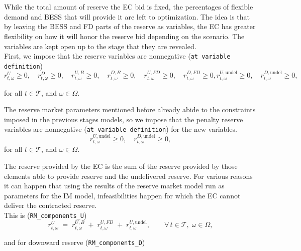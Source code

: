 \documentclass{article}
\begin{document}
\\
\\
While the total amount of reserve the EC bid is fixed, the percentages of flexible demand and BESS that will provide it are left to optimization. The idea is that by leaving the BESS and FD parts of the reserve as variables, the EC has greater flexibility on how it will honor the reserve bid depending on the scenario. The variables are kept open up to the stage that they are revealed.\\
First, we impose that the reserve variables are nonnegative (\verb|at variable definition|)
\begin{equation} \label{EQ:RVarDef}
    r^{U}_{t, \omega} \geq 0, \quad r^{D}_{t, \omega} \geq 0, \quad r^{U, B}_{t, \omega} \geq 0, \quad r^{D, B}_{t, \omega} \geq 0, \quad r^{U, FD}_{t, \omega} \geq 0, \quad r^{D, FD}_{t, \omega} \geq 0, r^{U,\text{undel}}_{t,\omega} \geq 0, \quad r^{D,\text{undel}}_{t,\omega} \geq 0, 
\end{equation}

for all $t \in \mathcal{T}$, and $\omega \in \Omega$. 


The reserve market parameters mentioned before already  abide to the constraints imposed in the previous stages models, so we impose that the penalty reserve variables are nonnegative (\verb|at variable definition|) for the new variables.\\
\begin{equation} \label{EQ:RVarDef}
    r^{U,\text{undel}}_{t,\omega} \geq 0, \quad r^{D,\text{undel}}_{t,\omega} \geq 0, 
\end{equation}
for all $t \in \mathcal{T}$, and $\omega \in \Omega$. 

The reserve provided by the EC is the sum of the reserve provided by those elements able to provide reserve and the undelivered reserve. For various reasons it can happen that using the results of the reserve market model run as parameters for the IM model, infeasibilities happen for which the EC cannot deliver the contracted reserve.  \\
This is (\verb|RM_components_U|)\\
\begin{equation} \label{EQ:RUcom}
    r^{U}_{t,\omega} \;=\;
        r^{U,B}_{t,\omega}
      \;+\; r^{U,FD}_{t,\omega}
      \;+\; r^{U,\text{undel}}_{t,\omega},
    \qquad \forall\, t\in\mathcal T,\;\omega\in\Omega ,
\end{equation}

and for downward reserve (\verb|RM_components_D|)
\end{document}
